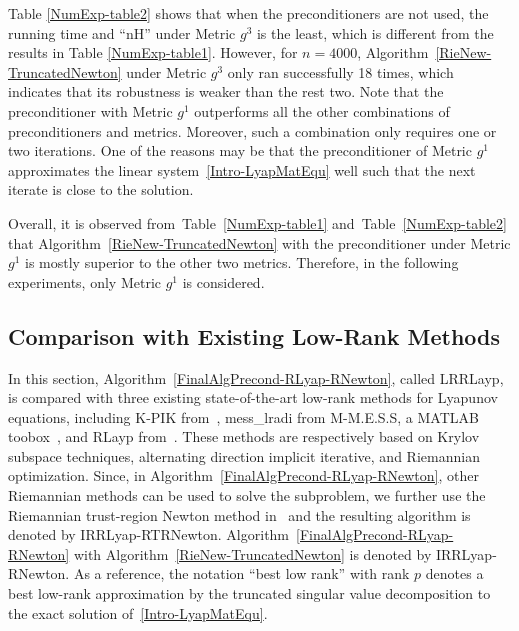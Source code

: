 \documentclass[11pt]{article}
\numberwithin{equation}{section}
\begin{document}
Table \ref{NumExp-table2} shows that when the preconditioners are not used, the running time and ``nH'' under Metric $g^3$ is the least, which is different from the results in Table \ref{NumExp-table1}. However, for $n=4000$, Algorithm~\ref{RieNew-TruncatedNewton} under Metric $g^3$ only ran successfully 18 times, which indicates that its robustness is weaker than the rest two. Note that the preconditioner with Metric $g^1$ outperforms all the other combinations of preconditioners and metrics. Moreover, such a combination only requires one or two iterations. One of the reasons may be that the preconditioner of Metric $g^1$ approximates the linear system~\eqref{Intro-LyapMatEqu} well such that the next iterate is close to the solution.


Overall, it is observed from~Table~\ref{NumExp-table1} and~Table~\ref{NumExp-table2} that Algorithm~\ref{RieNew-TruncatedNewton} with the preconditioner under Metric $g^1$ is mostly superior to the other two metrics. Therefore, in the following experiments, only Metric $g^1$ is considered.




\subsection{Comparison with Existing Low-Rank Methods} \label{NumExp-CompWithExistingSols}


In this section, Algorithm~\ref{FinalAlgPrecond-RLyap-RNewton}, called LRRLayp, is compared with  three existing state-of-the-art low-rank methods for Lyapunov equations, including K-PIK from~\cite{simoncini_new_2007}, mess\_lradi from M-M.E.S.S, a MATLAB toobox~\cite{SaaKB21-mmess-2.2}, and RLayp from~\cite{Bart10}. These methods are respectively based on Krylov subspace techniques, alternating direction implicit iterative, and Riemannian optimization. Since, in Algorithm~\ref{FinalAlgPrecond-RLyap-RNewton}, other Riemannian methods can be used to solve the subproblem, we further use the Riemannian trust-region Newton method in~\cite{Absil2007TrustRegionMO} and the resulting algorithm is denoted by IRRLyap-RTRNewton. Algorithm~\ref{FinalAlgPrecond-RLyap-RNewton} with Algorithm~\ref{RieNew-TruncatedNewton} is denoted by IRRLyap-RNewton. As a reference, the notation ``best low rank'' with rank $p$ denotes a best low-rank approximation by the truncated singular value decomposition to the exact solution of~\eqref{Intro-LyapMatEqu}.
\end{document}
